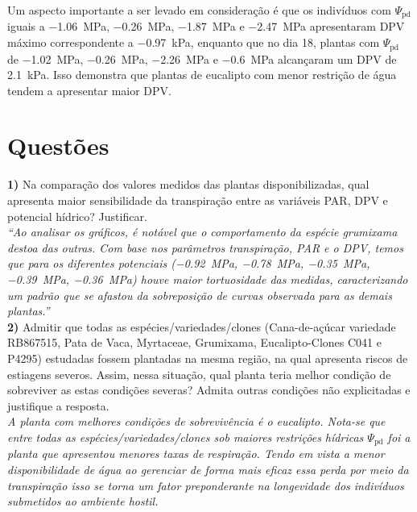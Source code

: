 \documentclass[a4paper, 12pt]{article}
\numberwithin{equation}{section}
\begin{document}
	Um aspecto importante a ser levado em consideração é que os indivíduos com $\Psi_{\textrm{pd}}$ iguais a \SI{-1.06}{\mega\pascal}, \SI{-.26}{\mega\pascal}, \SI{-1.87}{\mega\pascal} e \SI{-2.47}{\mega\pascal} apresentaram DPV máximo correspondente a \SI{-.97}{\kilo\pascal}, enquanto que no dia 18, plantas com $\Psi_{\textrm{pd}}$ de \SI{-1.02}{\mega\pascal}, \SI{-.26}{\mega\pascal}, \SI{-2.26}{\mega\pascal} e \SI{-.6}{\mega\pascal} alcançaram um DPV de \SI{2.1}{\kilo\pascal}. Isso demonstra que plantas de eucalipto com menor restrição de água tendem a apresentar maior DPV.  
	
	
	\section{Questões}
	\noindent\textbf{1)} Na comparação dos valores medidos das plantas disponibilizadas, qual apresenta maior sensibilidade da transpiração entre as variáveis PAR, DPV e potencial hídrico? Justificar.\\
	
	\noindent\textit{``Ao analisar os gráficos, é notável que o comportamento da espécie grumixama destoa das outras. Com base nos parâmetros transpiração, PAR e o DPV, temos que para os diferentes potenciais (\SI{-.92}{\mega\pascal}, \SI{-.78}{\mega\pascal}, \SI{-.35}{\mega\pascal}, \SI{-.39}{\mega\pascal}, \SI{-.36}{\mega\pascal}) houve maior tortuosidade das medidas, caracterizando um padrão que se afastou da sobreposição de curvas observada para as demais plantas.''}\\
	
	\noindent\textbf{2)} Admitir que todas as espécies/variedades/clones (Cana-de-açúcar variedade RB867515, Pata de Vaca, Myrtaceae, Grumixama, Eucalipto-Clones C041 e P4295) estudadas fossem plantadas na mesma região, na qual apresenta riscos de estiagens severos. Assim, nessa situação, qual planta teria melhor condição de sobreviver as estas condições severas? Admita outras condições não explicitadas e justifique a resposta.\\
	
	\noindent\textit{A planta com melhores condições de sobrevivência é o eucalipto. Nota-se que entre todas as espécies/variedades/clones sob maiores restrições hídricas $\Psi_{\textrm{pd}}$ foi a planta que apresentou menores taxas de respiração. Tendo em vista a menor disponibilidade de água ao gerenciar de forma mais eficaz essa perda por meio da transpiração isso se torna um fator preponderante na longevidade dos indivíduos submetidos ao ambiente hostil.}
	
\end{document}
